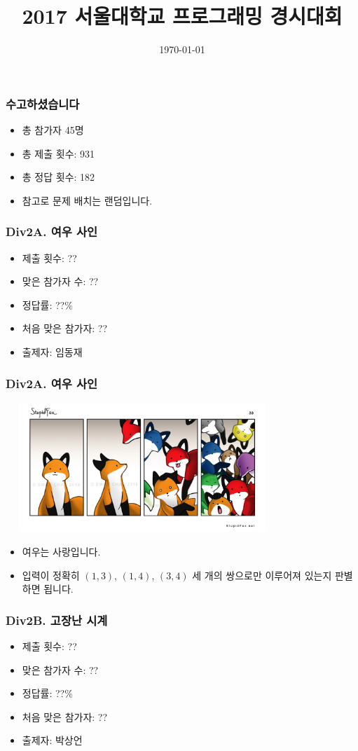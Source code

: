 \documentclass[xetex]{beamer}
\begin{document}
\title{2017 서울대학교 프로그래밍 경시대회}
\date{\today}

\frame{\titlepage}

\begin{frame}
  \frametitle{수고하셨습니다}
  \begin{itemize}
    \item 총 참가자 45명
    \item 총 제출 횟수: 931
    \item 총 정답 횟수: 182
    \item 참고로 문제 배치는 랜덤입니다.
  \end{itemize}
\end{frame}

\begin{frame}
  \frametitle{Div2A. 여우 사인}
  \begin{itemize}
    \item 제출 횟수: ??
    \item 맞은 참가자 수: ??
    \item 정답률: ??\%
    \item 처음 맞은 참가자: ??
    \item 출제자: 임동재
  \end{itemize}
\end{frame}

\begin{frame}
  \frametitle{Div2A. 여우 사인}
  \begin{center}
    \includegraphics[width=0.7\textwidth]{stupidfox.jpg}
  \end{center}
  \begin{itemize}
    \item 여우는 사랑입니다.
    \item 입력이 정확히 $(1, 3)$, $(1, 4)$, $(3, 4)$ 세 개의 쌍으로만 이루어져 있는지 판별하면 됩니다.
  \end{itemize}
\end{frame}

\begin{frame}
  \frametitle{Div2B. 고장난 시계}
  \begin{itemize}
    \item 제출 횟수: ??
    \item 맞은 참가자 수: ??
    \item 정답률: ??\%
    \item 처음 맞은 참가자: ??
    \item 출제자: 박상언
  \end{itemize}
\end{frame}
\end{document}
